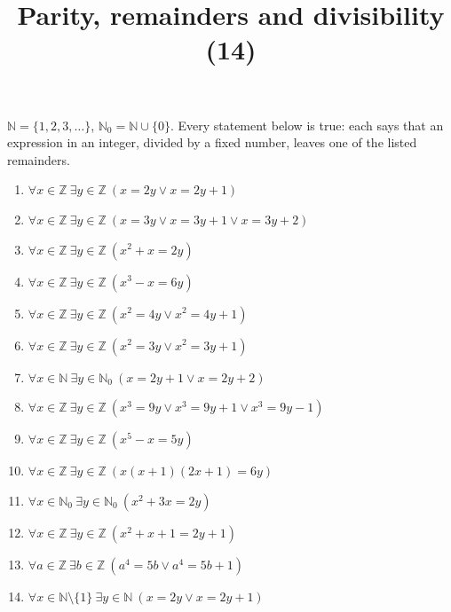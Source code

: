 \documentclass[11pt,a4paper]{article}
\title{Parity, remainders and divisibility (14)}
\author{}
\date{}
\begin{document}
\maketitle
$\mathbb{N} = \{1, 2, 3, \ldots\}$, $\mathbb{N}_{0} = \mathbb{N} \cup \{0\}$. Every statement below is true: each says that an expression in an integer, divided by a fixed number, leaves one of the listed remainders.

\begin{enumerate}
\item $\displaystyle \forall x \in \mathbb{Z}\ \exists y \in \mathbb{Z}\ (x = 2 y \lor x = 2 y + 1)$
\item $\displaystyle \forall x \in \mathbb{Z}\ \exists y \in \mathbb{Z}\ (x = 3 y \lor x = 3 y + 1 \lor x = 3 y + 2)$
\item $\displaystyle \forall x \in \mathbb{Z}\ \exists y \in \mathbb{Z}\ (x^{2} + x = 2 y)$
\item $\displaystyle \forall x \in \mathbb{Z}\ \exists y \in \mathbb{Z}\ (x^{3} - x = 6 y)$
\item $\displaystyle \forall x \in \mathbb{Z}\ \exists y \in \mathbb{Z}\ (x^{2} = 4 y \lor x^{2} = 4 y + 1)$
\item $\displaystyle \forall x \in \mathbb{Z}\ \exists y \in \mathbb{Z}\ (x^{2} = 3 y \lor x^{2} = 3 y + 1)$
\item $\displaystyle \forall x \in \mathbb{N}\ \exists y \in \mathbb{N}_{0}\ (x = 2 y + 1 \lor x = 2 y + 2)$
\item $\displaystyle \forall x \in \mathbb{Z}\ \exists y \in \mathbb{Z}\ (x^{3} = 9 y \lor x^{3} = 9 y + 1 \lor x^{3} = 9 y - 1)$
\item $\displaystyle \forall x \in \mathbb{Z}\ \exists y \in \mathbb{Z}\ (x^{5} - x = 5 y)$
\item $\displaystyle \forall x \in \mathbb{Z}\ \exists y \in \mathbb{Z}\ (x \left(x + 1\right) \left(2 x + 1\right) = 6 y)$
\item $\displaystyle \forall x \in \mathbb{N}_{0}\ \exists y \in \mathbb{N}_{0}\ (x^{2} + 3 x = 2 y)$
\item $\displaystyle \forall x \in \mathbb{Z}\ \exists y \in \mathbb{Z}\ (x^{2} + x + 1 = 2 y + 1)$
\item $\displaystyle \forall a \in \mathbb{Z}\ \exists b \in \mathbb{Z}\ (a^{4} = 5 b \lor a^{4} = 5 b + 1)$
\item $\displaystyle \forall x \in \mathbb{N} \setminus \{1\}\ \exists y \in \mathbb{N}\ (x = 2 y \lor x = 2 y + 1)$
\end{enumerate}
\end{document}

